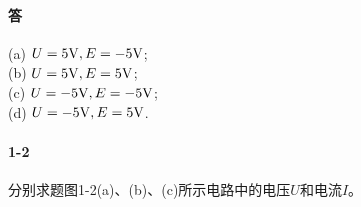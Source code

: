 \documentclass[hyperref, UTF8]{ctexart}
\begin{document}
\paragraph{答} (a) $U=5{\rm V}, E=-5{\rm V}$;  \\

(b) $U=5{\rm V}, E=5{\rm V}$;  \\

(c) $U=-5{\rm V}, E=-5{\rm V}$;  \\

(d) $U=-5{\rm V}, E=5{\rm V}$.  \\

\paragraph{1-2}
\label{1-2}
分别求题图1-2(a)、(b)、(c)所示电路中的电压$U$和电流$I$。
\end{document}
